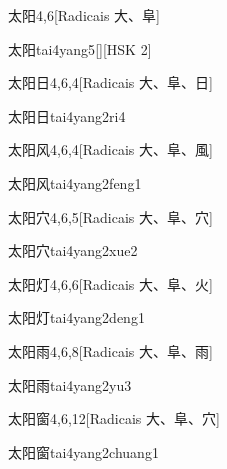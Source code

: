 \begin{entry}{太阳}{4,6}[Radicais ⼤、⾩]
  \begin{phonetics}{太阳}{tai4yang5}[][HSK 2]
  \end{phonetics}
\end{entry}

\begin{entry}{太阳日}{4,6,4}[Radicais ⼤、⾩、⽇]
  \begin{phonetics}{太阳日}{tai4yang2ri4}
  \end{phonetics}
\end{entry}

\begin{entry}{太阳风}{4,6,4}[Radicais ⼤、⾩、⾵]
  \begin{phonetics}{太阳风}{tai4yang2feng1}
  \end{phonetics}
\end{entry}

\begin{entry}{太阳穴}{4,6,5}[Radicais ⼤、⾩、⽳]
  \begin{phonetics}{太阳穴}{tai4yang2xue2}
  \end{phonetics}
\end{entry}

\begin{entry}{太阳灯}{4,6,6}[Radicais ⼤、⾩、⽕]
  \begin{phonetics}{太阳灯}{tai4yang2deng1}
  \end{phonetics}
\end{entry}

\begin{entry}{太阳雨}{4,6,8}[Radicais ⼤、⾩、⾬]
  \begin{phonetics}{太阳雨}{tai4yang2yu3}
  \end{phonetics}
\end{entry}

\begin{entry}{太阳窗}{4,6,12}[Radicais ⼤、⾩、⽳]
  \begin{phonetics}{太阳窗}{tai4yang2chuang1}
  \end{phonetics}
\end{entry}

